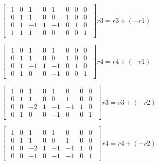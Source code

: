 \singlespacing

\begin{math}
    \begin{bmatrix}
        \begin{array}{cccc|cccc}
            1 & 0 & 1  & 0 & 1  & 0 & 0 & 0 \\
            0 & 1 & 1  & 0 & 0  & 1 & 0 & 0 \\
            0 & 1 & -1 & 1 & -1 & 0 & 1 & 0 \\
            1 & 1 & 1  & 0 & 0  & 0 & 0 & 1
        \end{array}
    \end{bmatrix}
    r3 = r3  + (-r1)
\end{math}

\singlespacing

\begin{math}
    \begin{bmatrix}
        \begin{array}{cccc|cccc}
            1 & 0 & 1  & 0 & 1  & 0 & 0 & 0 \\
            0 & 1 & 1  & 0 & 0  & 1 & 0 & 0 \\
            0 & 1 & -1 & 1 & -1 & 0 & 1 & 0 \\
            0 & 1 & 0  & 0 & -1 & 0 & 0 & 1
        \end{array}
    \end{bmatrix}
    r4 = r4  + (-r1)
\end{math}

\singlespacing

\begin{math}
    \begin{bmatrix}
        \begin{array}{cccc|cccc}
            1 & 0 & 1  & 0 & 1  & 0  & 0 & 0 \\
            0 & 1 & 1  & 0 & 0  & 1  & 0 & 0 \\
            0 & 0 & -2 & 1 & -1 & -1 & 1 & 0 \\
            0 & 1 & 0  & 0 & -1 & 0  & 0 & 1
        \end{array}
    \end{bmatrix}
    r3 = r3  + (-r2)
\end{math}


\singlespacing

\begin{math}
    \begin{bmatrix}
        \begin{array}{cccc|cccc}
            1 & 0 & 1  & 0 & 1  & 0  & 0 & 0 \\
            0 & 1 & 1  & 0 & 0  & 1  & 0 & 0 \\
            0 & 0 & -2 & 1 & -1 & -1 & 1 & 0 \\
            0 & 0 & -1 & 0 & -1 & -1 & 0 & 1
        \end{array}
    \end{bmatrix}
    r4 = r4  + (-r2)
\end{math}

